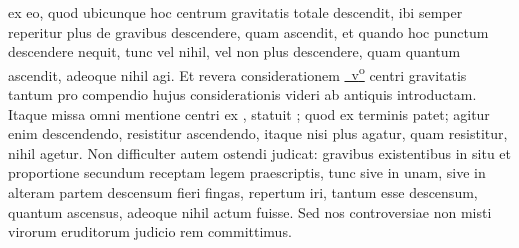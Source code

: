 ex eo, quod ubicunque hoc centrum gravitatis totale descendit,
ibi semper reperitur plus de gravibus descendere, quam ascendit, 
et quando hoc punctum descendere nequit, 
tunc vel nihil, vel non plus descendere,
quam quantum ascendit, adeoque nihil agi.
Et revera considerationem
\href{\Scan{LH_35_10_14_002v}}%
{~v\textsuperscript{o}\rbrack}
centri gravitatis 
tantum pro compendio hujus considerationis videri ab antiquis introductam.
Itaque missa omni mentione centri
ex , statuit 
;
quod ex terminis patet; agitur enim descendendo, resistitur ascendendo,
itaque nisi plus agatur, quam resistitur, nihil agetur.
Non difficulter autem ostendi judicat: gravibus existentibus in situ et proportione 
secundum receptam legem praescriptis, tunc sive in unam, 
\ledpb%
sive in alteram partem
descensum fieri fingas, repertum iri, tantum esse descensum, quantum ascensus,
adeoque nihil actum fuisse.
\pend
\pstart
Sed nos controversiae non misti virorum eruditorum judicio rem committimus.
\pend
